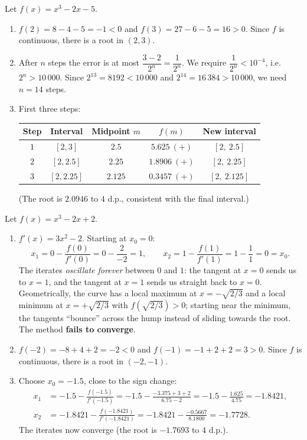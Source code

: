 \documentclass[11pt]{article}
\begin{document}
\begin{corrige}
Let $f(x) = x^{3} - 2x - 5$.
\begin{enumerate}
\item $f(2) = 8 - 4 - 5 = -1 < 0$ and $f(3) = 27 - 6 - 5 = 16 > 0$. Since $f$ is continuous, there is a root in $(2, 3)$.
\item After $n$ steps the error is at most $\dfrac{3-2}{2^{n}} = \dfrac{1}{2^{n}}$. We require $\dfrac{1}{2^{n}} < 10^{-4}$, i.e. $2^{n} > 10\,000$. Since $2^{13} = 8192 < 10\,000$ and $2^{14} = 16\,384 > 10\,000$, we need $\boxed{n = 14}$ steps.
\item First three steps:
\begin{center}
\begin{tabular}{|c|c|c|c|c|}
\hline
\rowcolor{popblueL} Step & Interval & Midpoint $m$ & $f(m)$ & New interval \\
\hline
$1$ & $[2, 3]$ & $2.5$ & $5.625\ (+)$ & $[2,\ 2.5]$ \\
$2$ & $[2, 2.5]$ & $2.25$ & $1.8906\ (+)$ & $[2,\ 2.25]$ \\
$3$ & $[2, 2.25]$ & $2.125$ & $0.3457\ (+)$ & $[2,\ 2.125]$ \\
\hline
\end{tabular}
\end{center}
(The root is $2.0946$ to $4$ d.p., consistent with the final interval.)
\end{enumerate}
\end{corrige}

\begin{corrige}
Let $f(x) = x^{3} - 2x + 2$.
\begin{enumerate}
\item $f'(x) = 3x^{2} - 2$. Starting at $x_{0} = 0$:
\[ x_{1} = 0 - \frac{f(0)}{f'(0)} = 0 - \frac{2}{-2} = 1, \qquad
x_{2} = 1 - \frac{f(1)}{f'(1)} = 1 - \frac{1}{1} = 0 = x_{0}. \]
The iterates \emph{oscillate forever} between $0$ and $1$: the tangent at $x = 0$ sends us to $x = 1$, and the tangent at $x = 1$ sends us straight back to $x = 0$. Geometrically, the curve has a local maximum at $x = -\sqrt{2/3}$ and a local minimum at $x = +\sqrt{2/3}$ with $f(\sqrt{2/3}) > 0$; starting near the minimum, the tangents ``bounce'' across the hump instead of sliding towards the root. The method \textbf{fails to converge}.
\item $f(-2) = -8 + 4 + 2 = -2 < 0$ and $f(-1) = -1 + 2 + 2 = 3 > 0$. Since $f$ is continuous, there is a root in $(-2, -1)$.
\item Choose $x_{0} = -1.5$, close to the sign change:
\begin{align*}
x_{1} &= -1.5 - \frac{f(-1.5)}{f'(-1.5)} = -1.5 - \frac{-3.375 + 3 + 2}{6.75 - 2} = -1.5 - \frac{1.625}{4.75} = -1.8421,\\
x_{2} &= -1.8421 - \frac{f(-1.8421)}{f'(-1.8421)} = -1.8421 - \frac{-0.5667}{8.1800} = -1.7728.
\end{align*}
The iterates now converge (the root is $-1.7693$ to $4$ d.p.).
\end{enumerate}
\end{corrige}
\end{document}
